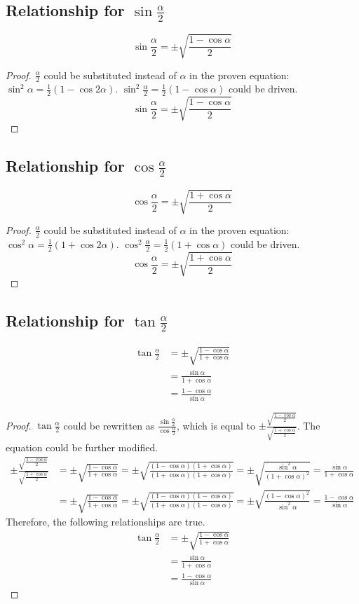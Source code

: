 \documentclass{article}
\begin{document}
\subsection{Relationship for $\sin\frac{\alpha}{2}$}
    \[
    \sin\frac{\alpha}{2}=\pm\sqrt{\frac{1-\cos\alpha}{2}}
    \]
\begin{proof}
    $\frac{\alpha}{2}$ could be substituted instead of $\alpha$ in the proven equation: $\sin^2\alpha=\frac{1}{2}(1-\cos2\alpha)$.
    $\sin^2\frac{\alpha}{2}=\frac{1}{2}(1-\cos\alpha)$ could be driven.
    \[
    \sin\frac{\alpha}{2}=\pm\sqrt{\frac{1-\cos\alpha}{2}}
    \]
\end{proof}

\subsection{Relationship for $\cos\frac{\alpha}{2}$}
    \[
    \cos\frac{\alpha}{2}=\pm\sqrt{\frac{1+\cos\alpha}{2}}
    \]
\begin{proof}
    $\frac{\alpha}{2}$ could be substituted instead of $\alpha$ in the proven equation: $\cos^2\alpha=\frac{1}{2}(1+\cos2\alpha)$.
    $\cos^2\frac{\alpha}{2}=\frac{1}{2}(1+\cos\alpha)$ could be driven.
    \[
    \cos\frac{\alpha}{2}=\pm\sqrt{\frac{1+\cos\alpha}{2}}
    \]
\end{proof}

\subsection{Relationship for $\tan\frac{\alpha}{2}$}
\begin{align*}
    \tan\frac{\alpha}{2}&=\pm\sqrt{\frac{1-\cos\alpha}{1+\cos\alpha}} \\
    &=\frac{\sin\alpha}{1+\cos\alpha} \\
    &=\frac{1-\cos\alpha}{\sin\alpha}
\end{align*}
\begin{proof}
    $\tan\frac{\alpha}{2}$ could be rewritten as $\frac{\sin\frac{\alpha}{2}}{\cos\frac{\alpha}{2}}$, which is equal to $\pm\frac{\sqrt{\frac{1-\cos\alpha}{2}}}{\sqrt{\frac{1+\cos\alpha}{2}}}$.
    The equation could be further modified.
    \begin{align*}
    \pm\frac{\sqrt{\frac{1-\cos\alpha}{2}}}{\sqrt{\frac{1+\cos\alpha}{2}}}
    &=\pm\sqrt{\frac{1-\cos\alpha}{1+\cos\alpha}}=\pm\sqrt{\frac{(1-\cos\alpha)(1+\cos\alpha)}{(1+\cos\alpha)(1+\cos\alpha)}}=\pm\sqrt{\frac{\sin^2\alpha}{(1+\cos\alpha)^2}}=\frac{\sin\alpha}{1+\cos\alpha} \\
    &=\pm\sqrt{\frac{1-\cos\alpha}{1+\cos\alpha}}=\pm\sqrt{\frac{(1-\cos\alpha)(1-\cos\alpha)}{(1+\cos\alpha)(1-\cos\alpha)}}=\pm\sqrt{\frac{(1-\cos\alpha)^2}{\sin^2\alpha}}=\frac{1-\cos\alpha}{\sin\alpha}
    \end{align*}
    Therefore, the following relationships are true.
    \begin{align*}
    \tan\frac{\alpha}{2}&=\pm\sqrt{\frac{1-\cos\alpha}{1+\cos\alpha}} \\
    &=\frac{\sin\alpha}{1+\cos\alpha} \\
    &=\frac{1-\cos\alpha}{\sin\alpha}
\end{align*}
\end{proof}
\end{document}
